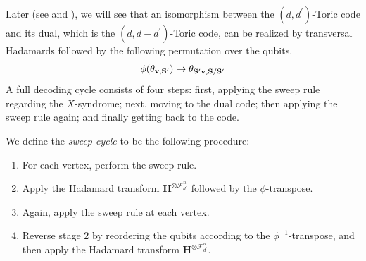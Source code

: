 Later (see  and ), we will see that an isomorphism between the $(d,d^{\prime})$-Toric code and its dual, which is the $(d,d-d^{\prime})$-Toric code, can be realized by transversal Hadamards followed by the following permutation over the qubits.
  \begin{equation*}
    \begin{split}
      \phi(\mathbf{\theta_{v ,S^{\prime}} }) \rightarrow \mathbf{\theta_{ S^{\prime}v  ,S/S^{\prime}} } 
    \end{split}
  \end{equation*}
A full decoding cycle consists of four steps: first, applying the sweep rule regarding the $X$-syndrome; next, moving to the dual code; then applying the sweep rule again; and finally getting back to the code.
\begin{definition}
We define the \textit{sweep cycle} to be the following procedure:
\begin{enumerate}
    \item For each vertex, perform the sweep rule.
    \item Apply the Hadamard transform $\mathbf{H}^{\otimes\mathcal{F}_{d^\prime}^{n}}$ followed by the $\phi$-transpose.
    \item Again, apply the sweep rule at each vertex.
    \item Reverse stage 2 by reordering the qubits according to the $\phi^{-1}$-transpose, and then apply the Hadamard transform $\mathbf{H}^{\otimes\mathcal{F}_{d^\prime}^{n}}$.
\end{enumerate}
\end{definition}



